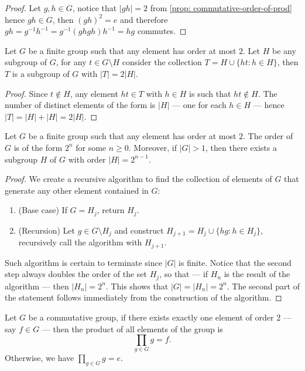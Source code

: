 \begin{proof}
Let \(g, h \in G\), notice that \(|gh| = 2\) from \cref{prop:
commutative-order-of-prod} hence \(gh \in G\), then \((gh)^2 = e\) and
therefore \(gh = g^{-1} h^{-1} = g^{-1}(ghgh)h^{-1} = hg\) commutes.
\end{proof}

\begin{lemma}
Let \(G\) be a finite group such that any element has order at most \(2\). Let
\(H\) be any subgroup of \(G\), for any \(t \in G \setminus H\) consider the
collection \(T = H \cup \{h t \colon h \in H\}\), then \(T\) is a subgroup of \(G\)
with \(|T| = 2|H|\).
\end{lemma}

\begin{proof}
Since \(t \not\in H\), any element \(ht \in T\) with \(h \in H\) is such that
\(ht \not\in H\). The number of distinct elements of the form is \(|H|\) ---
one for each \(h \in H\) --- hence \(|T| = |H| + |H| = 2|H|\).
\end{proof}

\begin{lemma}[Order \(2^n\)]\label{lem: order-2n}
Let \(G\) be a finite group such that any element has order at most \(2\). The
order of \(G\) is of the form \(2^n\) for some \(n \geq 0\). Moreover, if
\(|G| > 1\), then there exists a subgroup \(H\) of \(G\) with order \(|H| =
2^{n-1}\).
\end{lemma}

\begin{proof}
We create a recursive algorithm to find the collection of elements of \(G\)
that generate any other element contained in \(G\):
\begin{enumerate}
  \item (Base case) If \(G = H_j\), return \(H_j\).
  \item (Recursion) Let \(g \in G \setminus H_j\) and construct \(H_{j + 1} =
    H_j \cup \{h g \colon h \in H_j\}\), recursively call the algorithm with \(H_{j
    + 1}\).
\end{enumerate}
Such algorithm is certain to terminate since \(|G|\) is finite. Notice that
the second step always doubles the order of the set \(H_j\), so that --- if
\(H_n\) is the result of the algorithm --- then \(|H_n| = 2^n\). This shows
that \(|G| = |H_n| = 2^n\). The second part of the statement follows
immediately from the construction of the algorithm.
\end{proof}

\begin{proposition}
Let \(G\) be a commutative group, if there exists exactly one element of order
\(2\) --- say \(f \in G\) --- then the product of all elements of the group is
\[
  \prod_{g \in G} g = f.
\]
Otherwise, we have \(\prod_{g \in G} g = e\).
\end{proposition}

